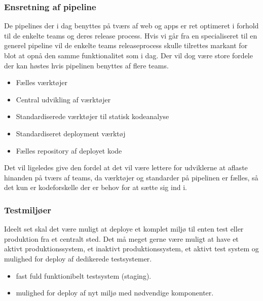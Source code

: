 \documentclass{article}
\begin{document}
\subsubsection{Ensretning af pipeline}
De pipelines der i dag benyttes på tværs af web og apps er ret optimeret i forhold til de enkelte teams og deres release process. Hvis vi går fra en specialiseret til en generel pipeline vil de enkelte teams releaseprocess skulle tilrettes markant for blot at opnå den samme funktionalitet som i dag. Der vil dog være store fordele der kan høstes hvis pipelinen benyttes af flere teams. 
\begin{itemize}
\item Fælles værktøjer
\item Central udvikling af værktøjer
\item Standardiserede værktøjer til statisk kodeanalyse
\item Standardiseret deployment værktøj
\item Fælles repository af deployet kode
\end{itemize}


Det vil ligeledes give den fordel at det vil være lettere for udviklerne at aflaste hinanden på tværs af teams, da værktøjer og standarder på pipelinen er fælles, så det kun er kodeforskelle der er behov for at sætte sig ind i.
 
\subsubsection{Testmiljøer}
Ideelt set skal det være muligt at deploye et komplet miljø til enten test eller produktion fra et centralt sted. Det må meget gerne være muligt at have et aktivt produktionssystem, et inaktivt produktionssystem, et aktivt test system og mulighed for deploy af dedikerede testsystemer. 

\begin{itemize}
    \item fast fuld funktionibelt testsystem (staging).
    \item mulighed for deploy af nyt miljø med nødvendige komponenter.
\end{itemize}
\end{document}
